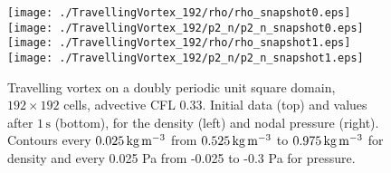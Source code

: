 \documentclass{ametsoc}
\theoremstyle{definition}
\begin{document}
\begin{figure}
\centering
 \texttt{[image: ./TravellingVortex\_192/rho/rho\_snapshot0.eps]}\texttt{[image: ./TravellingVortex\_192/p2\_n/p2\_n\_snapshot0.eps]}\\
 \texttt{[image: ./TravellingVortex\_192/rho/rho\_snapshot1.eps]}
 \texttt{[image: ./TravellingVortex\_192/p2\_n/p2\_n\_snapshot1.eps]}
 \caption{Travelling vortex on a doubly periodic unit square domain, $192\times192$ cells, advective CFL 0.33. Initial data (top) and values after $1\,\textrm{s}$ (bottom), for the density (left) and nodal pressure (right).  Contours every $0.025\,\textrm{kg\,m$^{-3}$}$
 from $0.525\,\textrm{kg\,m$^{-3}$}$ to $0.975\,\textrm{kg\,m$^{-3}$}$ for density and every 0.025 Pa from
-0.025 to -0.3 Pa for pressure.}
 \label{fig:trav_vortex_res}
\end{figure}
\end{document}
